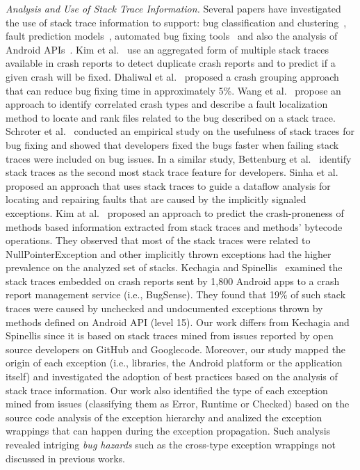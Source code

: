 \documentclass[conference]{IEEEtran}
\begin{document}
\textit{Analysis and Use of Stack Trace Information.} Several papers have
investigated the use of stack trace information to support: bug classification
and clustering~\cite{wang2013improving, kim2011crash, dhaliwal2011classifying},
fault prediction models~\cite{kim2013predicting}, automated
bug fixing tools~\cite{sinha2009fault} and also the analysis of Android APIs~\cite{kechagia2014}. 
Kim et al.~\cite{kim2011crash} use an
aggregated form of multiple stack traces available in crash reports to detect
duplicate crash reports and to predict if a given crash will be fixed. Dhaliwal
et al.~\cite{dhaliwal2011classifying} proposed a crash grouping approach that
can reduce bug fixing time in approximately 5\%. Wang et
al.~\cite{wang2013improving} propose an approach to identify correlated crash
types and describe a fault localization method to locate and rank files related
to the bug described on a stack trace. Schroter et al.~\cite{schroter2010stack}
conducted an empirical study on the usefulness of stack traces for bug fixing
and showed that developers fixed the bugs faster when failing stack traces were
included on bug issues.  In a similar study, Bettenburg et
al.~\cite{bettenburg2008makes} identify stack traces as the second most stack
trace feature for developers.  Sinha et al.~\cite{sinha2009fault} proposed an
approach that uses stack traces to guide a dataflow analysis for locating and
repairing faults that are caused by the implicitly signaled exceptions. Kim
at al.~\cite{kim2013predicting} proposed an approach to predict the
crash-proneness of methods based information extracted from stack traces and
methods' bytecode operations.  They observed that most of the stack traces were
related to NullPointerException and other implicitly thrown exceptions had
the higher prevalence on the analyzed set of stacks. Kechagia and Spinellis~\cite{kechagia2014}
examined the stack traces embedded on crash reports sent by 1,800 Android apps 
to a crash report management service (i.e., BugSense). They found that 19\% of such stack traces
were caused by unchecked and undocumented exceptions thrown by methods defined on 
Android API (level 15). Our work differs from Kechagia and Spinellis since it is based on
stack traces mined from issues reported by open source developers on GitHub and Googlecode.  
Moreover, our study mapped the origin of each exception 
(i.e., libraries, the Android platform or the application itself) and investigated
the adoption of best practices based on the analysis of stack trace information.
Our work also identified the type of each exception mined from issues
(classifying them as Error, Runtime or Checked) based on the source code
analysis of the exception hierarchy and analized the exception wrappings that can 
happen during the exception propagation.  Such analysis revealed intriging 
\emph{bug hazards} such as the cross-type exception wrappings not discussed in previous works.
\end{document}

